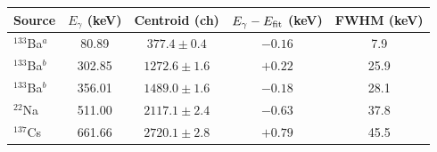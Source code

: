 \begin{tabular}{lcccc}
\hline\hline
Source & $E_\gamma$ (keV) & Centroid (ch) & $E_\gamma-E_{\rm fit}$ (keV) & FWHM (keV)\\
\hline
$^{133}$Ba$^{a}$ & 80.89 & $377.4\pm0.4$ & $-0.16$ & 7.9\\
$^{133}$Ba$^{b}$ & 302.85 & $1272.6\pm1.6$ & $+0.22$ & 25.9\\
$^{133}$Ba$^{b}$ & 356.01 & $1489.0\pm1.6$ & $-0.18$ & 28.1\\
$^{22}$Na & 511.00 & $2117.1\pm2.4$ & $-0.63$ & 37.8\\
$^{137}$Cs & 661.66 & $2720.1\pm2.8$ & $+0.79$ & 45.5\\
\hline\hline
\end{tabular}
